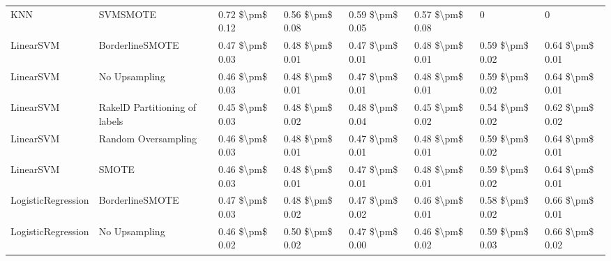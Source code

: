 \begin{tabular}{llllllll}
                            KNN &                      SVMSMOTE & 0.72 \$\textbackslash pm\$ 0.12 &           0.56 \$\textbackslash pm\$ 0.08 &       0.59 \$\textbackslash pm\$ 0.05 &        0.57 \$\textbackslash pm\$ 0.08 &                                       0 &                   0 \\
                      LinearSVM &               BorderlineSMOTE & 0.47 \$\textbackslash pm\$ 0.03 &           0.48 \$\textbackslash pm\$ 0.01 &       0.47 \$\textbackslash pm\$ 0.01 &        0.48 \$\textbackslash pm\$ 0.01 &                         0.59 \$\textbackslash pm\$ 0.02 &     0.64 \$\textbackslash pm\$ 0.01 \\
                      LinearSVM &                 No Upsampling & 0.46 \$\textbackslash pm\$ 0.03 &           0.48 \$\textbackslash pm\$ 0.01 &       0.47 \$\textbackslash pm\$ 0.01 &        0.48 \$\textbackslash pm\$ 0.01 &                         0.59 \$\textbackslash pm\$ 0.02 &     0.64 \$\textbackslash pm\$ 0.01 \\
                      LinearSVM & RakelD Partitioning of labels & 0.45 \$\textbackslash pm\$ 0.03 &           0.48 \$\textbackslash pm\$ 0.02 &       0.48 \$\textbackslash pm\$ 0.04 &        0.45 \$\textbackslash pm\$ 0.02 &                         0.54 \$\textbackslash pm\$ 0.02 &     0.62 \$\textbackslash pm\$ 0.02 \\
                      LinearSVM &           Random Oversampling & 0.46 \$\textbackslash pm\$ 0.03 &           0.48 \$\textbackslash pm\$ 0.01 &       0.47 \$\textbackslash pm\$ 0.01 &        0.48 \$\textbackslash pm\$ 0.01 &                         0.59 \$\textbackslash pm\$ 0.02 &     0.64 \$\textbackslash pm\$ 0.01 \\
                      LinearSVM &                         SMOTE & 0.46 \$\textbackslash pm\$ 0.03 &           0.48 \$\textbackslash pm\$ 0.01 &       0.47 \$\textbackslash pm\$ 0.01 &        0.48 \$\textbackslash pm\$ 0.01 &                         0.59 \$\textbackslash pm\$ 0.02 &     0.64 \$\textbackslash pm\$ 0.01 \\
             LogisticRegression &               BorderlineSMOTE & 0.47 \$\textbackslash pm\$ 0.03 &           0.48 \$\textbackslash pm\$ 0.02 &       0.47 \$\textbackslash pm\$ 0.02 &        0.46 \$\textbackslash pm\$ 0.01 &                         0.58 \$\textbackslash pm\$ 0.02 &     0.66 \$\textbackslash pm\$ 0.01 \\
             LogisticRegression &                 No Upsampling & 0.46 \$\textbackslash pm\$ 0.02 &           0.50 \$\textbackslash pm\$ 0.02 &       0.47 \$\textbackslash pm\$ 0.00 &        0.46 \$\textbackslash pm\$ 0.02 &                         0.59 \$\textbackslash pm\$ 0.03 &     0.66 \$\textbackslash pm\$ 0.02 \\

\end{tabular}

